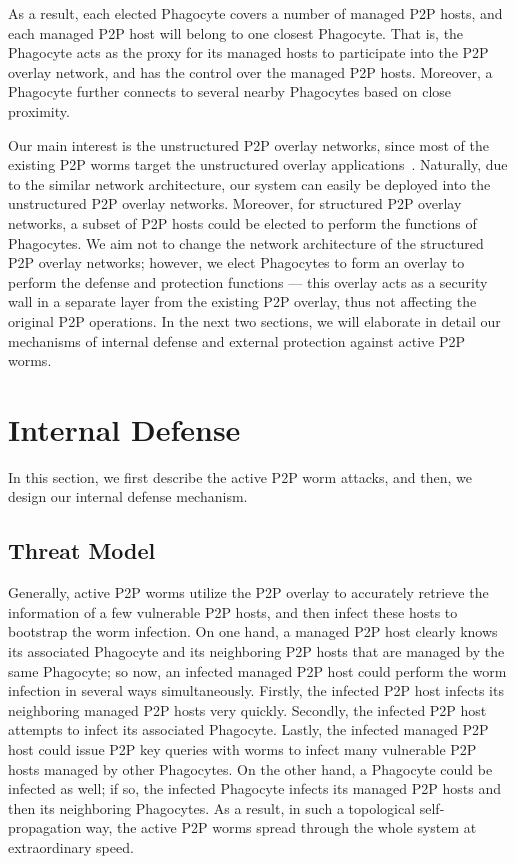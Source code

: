 \documentclass[times,10pt,twocolumn]{article}
\begin{document}
As a result, each elected Phagocyte covers a number of managed P2P
hosts, and each managed P2P host will belong to one closest
Phagocyte. That is, the Phagocyte acts as the proxy for its managed
hosts to participate into the P2P overlay network, and has the
control over the managed P2P hosts. Moreover, a Phagocyte further
connects to several nearby Phagocytes based on close proximity.





Our main interest is the unstructured P2P overlay networks, since
most of the existing P2P worms target the unstructured overlay
applications~\cite{p2p-worm-website}. Naturally, due to the similar
network architecture, our system can easily be deployed into the
unstructured P2P overlay networks. Moreover, for structured P2P
overlay networks, a subset of P2P hosts could be elected to perform
the functions of Phagocytes. We aim not to change the network
architecture of the structured P2P overlay networks; however, we
elect Phagocytes to form an overlay to perform the defense and
protection functions --- this overlay acts as a security wall in a
separate layer from the existing P2P overlay, thus not affecting the
original P2P operations. In the next two sections, we will elaborate
in detail our mechanisms of internal defense and external protection
against active P2P worms.






\section{Internal Defense}
\label{sec:InternalDefenses}

In this section, we first describe the active P2P worm attacks, and
then, we design our internal defense mechanism.




\subsection{Threat Model}
\label{subsec:threat_model}


Generally, active P2P worms utilize the P2P overlay to accurately
retrieve the information of a few vulnerable P2P hosts, and then
infect these hosts to bootstrap the worm infection. On one hand, a
managed P2P host clearly knows its associated Phagocyte and its
neighboring P2P hosts that are managed by the same Phagocyte; so
now, an infected managed P2P host could perform the worm infection
in several ways simultaneously. Firstly, the infected P2P host
infects its neighboring managed P2P hosts very quickly. Secondly,
the infected P2P host attempts to infect its associated Phagocyte.
Lastly, the infected managed P2P host could issue P2P key queries
with worms to infect many vulnerable P2P hosts managed by other
Phagocytes. On the other hand, a Phagocyte could be infected as
well; if so, the infected Phagocyte infects its managed P2P hosts
and then its neighboring Phagocytes. As a result, in such a
topological self-propagation way, the active P2P worms spread
through the whole system at extraordinary speed.
\end{document}
